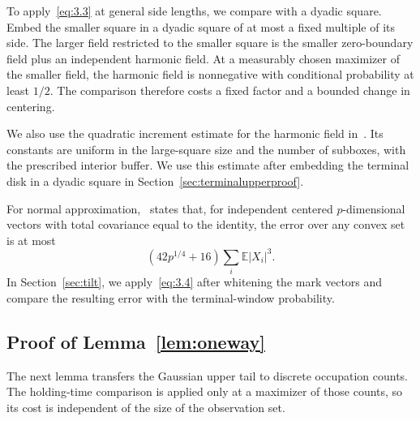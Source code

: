 \documentclass[11pt,a4paper]{article}
\numberwithin{equation}{section}
\theoremstyle{remark}
\begin{document}
To apply~\eqref{eq:3.3} at general side lengths, we compare with a dyadic square. Embed the smaller square in a dyadic square of at most a fixed multiple of its side. The larger field restricted to the smaller square is the smaller zero-boundary field plus an independent harmonic field. At a measurably chosen maximizer of the smaller field, the harmonic field is nonnegative with conditional probability at least $1/2$. The comparison therefore costs a fixed factor and a bounded change in centering.

We also use the quadratic increment estimate for the harmonic field in~\cite[Lemma 3.10, equation (45)]{BDZ}. Its constants are uniform in the large-square size and the number of subboxes, with the prescribed interior buffer. We use this estimate after embedding the terminal disk in a dyadic square in Section~\ref{sec:terminalupperproof}.

For normal approximation,~\cite[Theorem 1.1]{BE} states that, for independent centered $p$-dimensional vectors with total covariance equal to the identity, the error over any convex set is at most
\begin{equation}\label{eq:3.4}
(42p^{1/4}+16)\sum_i\mathbb E|X_i|^3.
\end{equation}
In Section~\ref{sec:tilt}, we apply~\eqref{eq:3.4} after whitening the mark vectors and compare the resulting error with the terminal-window probability.

\subsection{Proof of Lemma~\ref{lem:oneway}}\label{sec:oneway}
The next lemma transfers the Gaussian upper tail to discrete occupation counts. The holding-time comparison is applied only at a maximizer of those counts, so its cost is independent of the size of the observation set.
\end{document}
